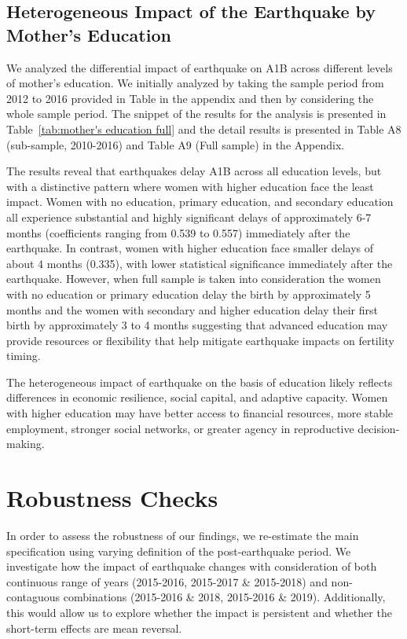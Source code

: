 \documentclass[11pt,a4paper]{article}
\begin{document}
\vspace{0.25cm}

\subsection{Heterogeneous Impact of the Earthquake by Mother's Education}

We analyzed the differential impact of earthquake on A1B across different levels of mother's education. We initially analyzed by taking the sample period from 2012 to 2016 provided in Table in the appendix and then by considering the whole sample period. The snippet of the results for the analysis is presented in Table~\ref{tab:mother's education full} and the detail results is presented in Table A8 (sub-sample, 2010-2016) and Table A9 (Full sample) in the Appendix.


The results reveal that earthquakes delay A1B across all education levels, but with a distinctive pattern where women with higher education face the least impact. Women with no education, primary education, and secondary education all experience substantial and highly significant delays of approximately 6-7 months (coefficients ranging from 0.539 to 0.557) immediately after the earthquake. In contrast, women with higher education face smaller delays of about 4 months (0.335), with lower statistical significance immediately after the earthquake. However, when full sample is taken into consideration the women with no education or primary education delay the birth by approximately 5 months and the women with secondary and higher education delay their first birth by approximately 3 to 4 months suggesting that advanced education may provide resources or flexibility that help mitigate earthquake impacts on fertility timing.

\vspace{0.25cm}

The heterogeneous impact of earthquake on the basis of education  likely reflects differences in economic resilience, social capital, and adaptive capacity. Women with higher education may have better access to financial resources, more stable employment, stronger social networks, or greater agency in reproductive decision-making. 

\vspace{0.25 cm}

\section{Robustness Checks}
In order to assess the robustness of our findings, we re-estimate the main specification using varying definition of the post-earthquake period. We investigate how the impact of earthquake changes with consideration of both continuous range of years (2015-2016, 2015-2017 \& 2015-2018) and non-contaguous combinations (2015-2016 \& 2018, 2015-2016 \& 2019). Additionally, this would allow us to explore whether the impact is persistent and whether the short-term effects are mean reversal.
\end{document}
